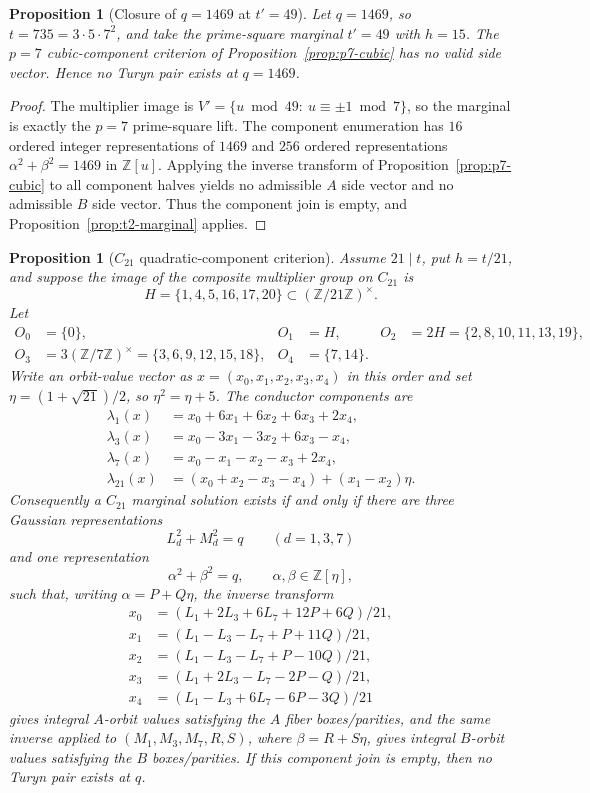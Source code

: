 \documentclass[11pt]{article}
\theoremstyle{plain}
\newtheorem{proposition}[theorem]{Proposition}
\theoremstyle{definition}
\theoremstyle{remark}
\newcommand{\Z}{\mathbb Z}
\begin{document}
\begin{proposition}[Closure of $q=1469$ at $t'=49$]\label{prop:q1469-p7-cubic}
Let $q=1469$, so $t=735=3\cdot5\cdot7^2$, and take the prime-square marginal
$t'=49$ with $h=15$.  The $p=7$ cubic-component criterion of
Proposition~\ref{prop:p7-cubic} has no valid side vector.  Hence no Turyn pair
exists at $q=1469$.
\end{proposition}

\begin{proof}
The multiplier image is
$V'=\{u\bmod49:\ u\equiv\pm1\bmod7\}$, so the marginal is exactly the
$p=7$ prime-square lift.  The component enumeration has $16$ ordered integer
representations of $1469$ and $256$ ordered representations
$\alpha^2+\beta^2=1469$ in $\Z[u]$.  Applying the inverse transform of
Proposition~\ref{prop:p7-cubic} to all component halves yields no admissible
$A$ side vector and no admissible $B$ side vector.  Thus the component join is
empty, and Proposition~\ref{prop:t2-marginal} applies.
\end{proof}

\begin{proposition}[$C_{21}$ quadratic-component criterion]\label{prop:c21-sqrt21}
Assume $21\mid t$, put $h=t/21$, and suppose the image of the composite
multiplier group on $C_{21}$ is
\[
  H=\{1,4,5,16,17,20\}\subset(\Z/21\Z)^\times .
\]
Let
\[
\begin{aligned}
O_0&=\{0\},&
O_1&=H,&
O_2&=2H=\{2,8,10,11,13,19\},\\
O_3&=3(\Z/7\Z)^\times=\{3,6,9,12,15,18\},&
O_4&=\{7,14\}.
\end{aligned}
\]
Write an orbit-value vector as $x=(x_0,x_1,x_2,x_3,x_4)$ in this order and set
$\eta=(1+\sqrt{21})/2$, so $\eta^2=\eta+5$. The conductor components are
\[
\begin{aligned}
  \lambda_1(x)&=x_0+6x_1+6x_2+6x_3+2x_4,\\
  \lambda_3(x)&=x_0-3x_1-3x_2+6x_3-x_4,\\
  \lambda_7(x)&=x_0-x_1-x_2-x_3+2x_4,\\
  \lambda_{21}(x)&=(x_0+x_2-x_3-x_4)+(x_1-x_2)\eta .
\end{aligned}
\]
Consequently a $C_{21}$ marginal solution exists if and only if there are
three Gaussian representations
\[
  L_d^2+M_d^2=q\qquad(d=1,3,7)
\]
and one representation
\[
  \alpha^2+\beta^2=q,\qquad \alpha,\beta\in\Z[\eta],
\]
such that, writing $\alpha=P+Q\eta$, the inverse transform
\[
\begin{aligned}
  x_0&=(L_1+2L_3+6L_7+12P+6Q)/21,\\
  x_1&=(L_1-L_3-L_7+P+11Q)/21,\\
  x_2&=(L_1-L_3-L_7+P-10Q)/21,\\
  x_3&=(L_1+2L_3-L_7-2P-Q)/21,\\
  x_4&=(L_1-L_3+6L_7-6P-3Q)/21
\end{aligned}
\]
gives integral $A$-orbit values satisfying the $A$ fiber boxes/parities, and
the same inverse applied to $(M_1,M_3,M_7,R,S)$, where $\beta=R+S\eta$, gives
integral $B$-orbit values satisfying the $B$ boxes/parities. If this component
join is empty, then no Turyn pair exists at $q$.
\end{proposition}
\end{document}
